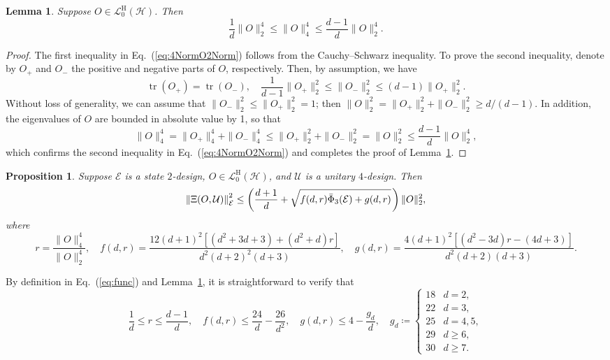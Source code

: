 \documentclass[aps,pra,twocolumn,nofootinbib,superscriptaddress,10pt]{revtex4-2}
\newtheorem{lemma}{Lemma}
\newtheorem{proposition}{Proposition}
\DeclareMathOperator{\tr}{tr}
\newcommand{\lsp}{\mkern 2mu}           %
\newcommand{\caE}{\mathcal{E}}
\newcommand{\caH}{\mathcal{H}}
\newcommand{\caL}{\mathcal{L}}
\newcommand{\caU}{\mathcal{U}}
\newcommand{\rmH}{\mathrm{H}}
\newcommand{\bPhi}{\bar{\Phi}}
\newcommand{\eref}[1]{Eq.~\textup{(\ref{#1})}}
\newcommand{\lref}[1]{Lemma~\ref{#1}}
\begin{document}
\begin{lemma}\label{lem:4NormO2Norm}
Suppose $O\in \caL^{\rmH}_0(\caH)$. Then
\begin{equation}
\frac{1}{d}\|O\|_2^4 \leq \|O\|_4^4\leq \frac{d-1}{d}\|O\|_2^4.  \label{eq:4NormO2Norm}
\end{equation}
\end{lemma}
\begin{proof}
The first inequality in \eref{eq:4NormO2Norm} follows from the Cauchy--Schwarz inequality. To prove the second inequality, denote by $O_+$ and $O_-$ the positive and negative parts of $O$, respectively. Then, by assumption, we have
\begin{equation}
  \tr(O_+)=\tr(O_-),\quad  \frac{1}{d-1} \|O_+\|_2^2\leq \|O_-\|_2^2\leq (d-1)\|O_+\|_2^2.
\end{equation}
Without loss of generality, we can assume that $\|O_-\|_2^2\leq \|O_+\|_2^2=1$; then $\|O\|_2^2=\|O_+\|_2^2+\|O_-\|_2^2\geq d/(d-1)$.  In addition, the eigenvalues of $O$ are bounded in absolute value by 1, so that
\begin{equation}
   \|O\|_4^4=\|O_+\|_4^4+\|O_-\|_4^4\leq \|O_+\|_2^2+\|O_-\|_2^2= \|O\|_2^2 \leq \frac{d-1}{d}\|O\|_2^4,
\end{equation}
which confirms the second inequality in \eref{eq:4NormO2Norm} and completes the proof of \lref{lem:4NormO2Norm}.
\end{proof}

\begin{proposition}
\label{pro:AvgShNormTUB}
   Suppose $\caE$ is a state $2$-design, $O \in \caL^{\rmH}_0(\caH)$, and $\caU$ is a unitary $4$-design. Then
   \begin{align}    
   \left\|\Xi(O,\caU)\right\|_\caE^2 \le \left(\frac{d+1}{d}+\sqrt{f(d,r)\bPhi_3(\caE)+g(d,r)}\lsp\right)\|O\|_2^2,    \label{eq:AvgShNormTUB}
   \end{align}
   where
   \begin{equation}
r=\frac{\|O\|_4^4}{\|O\|_2^4}, \quad  f(d,r)=\frac{12(d+1)^2\left[(d^2+3d+3)+(d^2+d)r\right]}{d^2(d+2)^2(d+3)},\quad g(d,r)=\frac{4(d+1)^2\left[(d^2-3d)r-(4d+3)\right]}{d^2(d+2)(d+3)}.     \label{eq:func}
   \end{equation}
\end{proposition}
By definition in \eref{eq:func} and \lref{lem:4NormO2Norm}, it is straightforward to verify that
\begin{equation}\label{eq:func2}
\frac{1}{d}\le r\le \frac{d-1}{d},\quad
f(d,r) \le \frac{24}{d} - \frac{26}{d^2},\quad
g(d,r) \le 4-\frac{g_d}{d},\quad
g_d\coloneqq\begin{cases}
18 & d=2,\\
22 & d=3,\\
25 & d=4,5,\\
29 &d\geq 6,\\
30 &d\geq 7.
\end{cases}
\end{equation}
\end{document}
